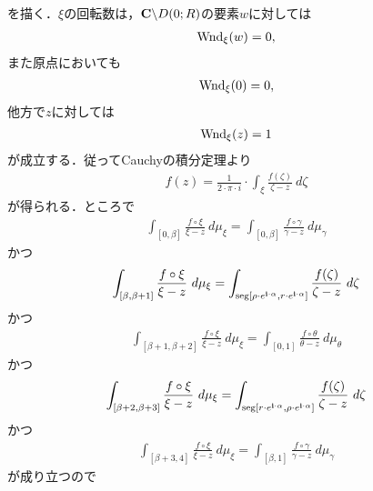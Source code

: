 	を描く．$\xi$の回転数は，$\mathbf{C} \backslash D(0;R)$の要素$w$に対しては
	\begin{align}
		\operatorname{Wnd}_{\xi}(w) = 0,
		\label{fom:Laurent_series_2}
	\end{align}
	また原点においても
	\begin{align}
		\operatorname{Wnd}_{\xi}(0) = 0,
		\label{fom:Laurent_series_3}
	\end{align}
	他方で$z$に対しては
	\begin{align}
		\operatorname{Wnd}_{\xi}(z) = 1
		\label{fom:Laurent_series_4}
	\end{align}
	が成立する．従ってCauchyの積分定理より
	\begin{align}
		f(z) = \frac{1}{2 \cdot \pi \cdot i} \cdot \int_{\xi} \frac{f(\zeta)}{\zeta - z}\ d\zeta
	\end{align}
	が得られる．ところで
	\begin{align}
		\int_{[0,\beta]} \frac{f \circ \xi}{\xi - z}\ d\mu_{\xi} 
		= \int_{[0,\beta]} \frac{f \circ \gamma}{\gamma - z}\ d\mu_{\gamma}
		\label{fom:Laurent_series_5}
	\end{align}
	かつ
	\begin{align}
		\int_{[\beta,\beta+1]} \frac{f \circ \xi}{\xi - z}\ d\mu_{\xi}
		= \int_{\operatorname{seg}[\rho \cdot e^{\mathbf{i} \cdot \alpha},r \cdot e^{\mathbf{i} \cdot \alpha}]} \frac{f(\zeta)}{\zeta - z}\ d\zeta
		\label{fom:Laurent_series_6}
	\end{align}
	かつ
	\begin{align}
		\int_{[\beta+1,\beta+2]} \frac{f \circ \xi}{\xi - z}\ d\mu_{\xi}
		= \int_{[0,1]} \frac{f \circ \theta}{\theta - z}\ d\mu_{\theta}
		\label{fom:Laurent_series_7}
	\end{align}
	かつ
	\begin{align}
		\int_{[\beta+2,\beta+3]} \frac{f \circ \xi}{\xi - z}\ d\mu_{\xi}
		= \int_{\operatorname{seg}[r \cdot e^{\mathbf{i} \cdot \alpha},\rho \cdot e^{\mathbf{i} \cdot \alpha}]} \frac{f(\zeta)}{\zeta - z}\ d\zeta
		\label{fom:Laurent_series_8}
	\end{align}
	かつ
	\begin{align}
		\int_{[\beta+3,4]} \frac{f \circ \xi}{\xi - z}\ d\mu_{\xi}
		= \int_{[\beta,1]} \frac{f \circ \gamma}{\gamma - z}\ d\mu_{\gamma}
		\label{fom:Laurent_series_9}
	\end{align}
	が成り立つので
